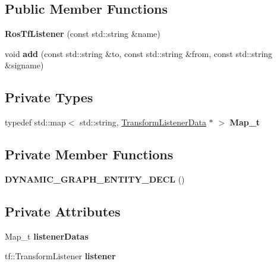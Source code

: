 \subsection*{Public Member Functions}
\begin{DoxyCompactItemize}
\item 
{\bfseries Ros\+Tf\+Listener} (const std\+::string \&name)\hypertarget{classdynamic__graph_1_1RosTfListener_a475236fb89bcd8c28b28822344f6b5da}{}\label{classdynamic__graph_1_1RosTfListener_a475236fb89bcd8c28b28822344f6b5da}

\item 
void {\bfseries add} (const std\+::string \&to, const std\+::string \&from, const std\+::string \&signame)\hypertarget{classdynamic__graph_1_1RosTfListener_ad886b7323f3f7df3171e8f3be8a7218a}{}\label{classdynamic__graph_1_1RosTfListener_ad886b7323f3f7df3171e8f3be8a7218a}

\end{DoxyCompactItemize}
\subsection*{Private Types}
\begin{DoxyCompactItemize}
\item 
typedef std\+::map$<$ std\+::string, \hyperlink{structdynamic__graph_1_1internal_1_1TransformListenerData}{Transform\+Listener\+Data} $\ast$ $>$ {\bfseries Map\+\_\+t}\hypertarget{classdynamic__graph_1_1RosTfListener_ac0a00a872e603785083d9c3150576ac1}{}\label{classdynamic__graph_1_1RosTfListener_ac0a00a872e603785083d9c3150576ac1}

\end{DoxyCompactItemize}
\subsection*{Private Member Functions}
\begin{DoxyCompactItemize}
\item 
{\bfseries D\+Y\+N\+A\+M\+I\+C\+\_\+\+G\+R\+A\+P\+H\+\_\+\+E\+N\+T\+I\+T\+Y\+\_\+\+D\+E\+CL} ()\hypertarget{classdynamic__graph_1_1RosTfListener_a1300e26161cbad01a3bc8a58d12fb2a1}{}\label{classdynamic__graph_1_1RosTfListener_a1300e26161cbad01a3bc8a58d12fb2a1}

\end{DoxyCompactItemize}
\subsection*{Private Attributes}
\begin{DoxyCompactItemize}
\item 
Map\+\_\+t {\bfseries listener\+Datas}\hypertarget{classdynamic__graph_1_1RosTfListener_a45ebb4c97f34338601d5b0d2899f5a3e}{}\label{classdynamic__graph_1_1RosTfListener_a45ebb4c97f34338601d5b0d2899f5a3e}

\item 
tf\+::\+Transform\+Listener {\bfseries listener}\hypertarget{classdynamic__graph_1_1RosTfListener_aa18dd1498c092546813df3c10e53960d}{}\label{classdynamic__graph_1_1RosTfListener_aa18dd1498c092546813df3c10e53960d}

\end{DoxyCompactItemize}


